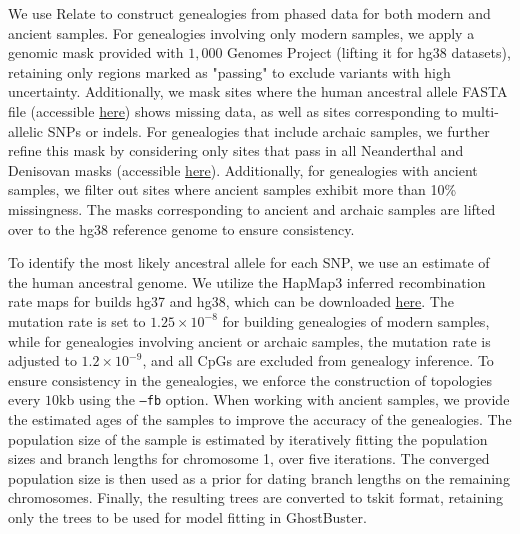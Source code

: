 We use Relate \cite{speidel2019method} to construct genealogies from phased data for both modern and ancient samples. For genealogies involving only modern samples, we apply a genomic mask provided with $1{,}000$ Genomes Project (lifting it for hg38 datasets), retaining only regions marked as "passing" to exclude variants with high uncertainty. Additionally, we mask sites where the human ancestral allele FASTA file (accessible \href{ftp://ftp.ensembl.org/pub/release-74/fasta/ancestral_alleles/homo_sapiens_ancestor_GRCh37_e71.tar.bz2}{here}) shows missing data, as well as sites corresponding to multi-allelic SNPs or indels. For genealogies that include archaic samples, we further refine this mask by considering only sites that pass in all Neanderthal and Denisovan masks (accessible \href{http://ftp.eva.mpg.de/neandertal/}{here}). Additionally, for genealogies with ancient samples, we filter out sites where ancient samples exhibit more than 10\% missingness. The masks corresponding to ancient and archaic samples are lifted over to the hg38 reference genome to ensure consistency.

To identify the most likely ancestral allele for each SNP, we use an estimate of the human ancestral genome. We utilize the HapMap3 inferred recombination rate maps for builds hg37 and hg38, which can be downloaded \href{https://github.com/odelaneau/shapeit5/tree/main/resources/maps/}{here}. The mutation rate is set to $1.25 \times 10^{-8}$ for building genealogies of modern samples, while for genealogies involving ancient or archaic samples, the mutation rate is adjusted to $1.2 \times 10^{-9}$, and all CpGs are excluded from genealogy inference. To ensure consistency in the genealogies, we enforce the construction of topologies every $10$kb using the \texttt{--fb} option. When working with ancient samples, we provide the estimated ages of the samples to improve the accuracy of the genealogies. The population size of the sample is estimated by iteratively fitting the population sizes and branch lengths for chromosome 1, over five iterations. The converged population size is then used as a prior for dating branch lengths on the remaining chromosomes. Finally, the resulting trees are converted to tskit format, retaining only the trees to be used for model fitting in GhostBuster.


